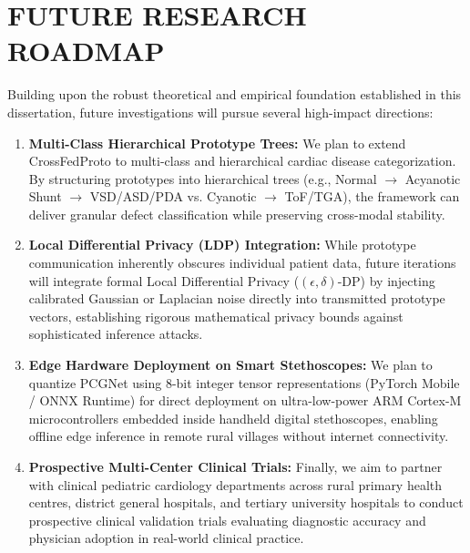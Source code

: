 \documentclass[12pt,a4paper]{amritareport}
\begin{document}
\section{FUTURE RESEARCH ROADMAP}

Building upon the robust theoretical and empirical foundation established in this dissertation, future investigations will pursue several high-impact directions:
\begin{enumerate}
	\item \textbf{Multi-Class Hierarchical Prototype Trees:} We plan to extend CrossFedProto to multi-class and hierarchical cardiac disease categorization. By structuring prototypes into hierarchical trees (e.g., Normal $\to$ Acyanotic Shunt $\to$ VSD/ASD/PDA vs. Cyanotic $\to$ ToF/TGA), the framework can deliver granular defect classification while preserving cross-modal stability.
	\item \textbf{Local Differential Privacy (LDP) Integration:} While prototype communication inherently obscures individual patient data, future iterations will integrate formal Local Differential Privacy ($(\epsilon, \delta)$-DP) by injecting calibrated Gaussian or Laplacian noise directly into transmitted prototype vectors, establishing rigorous mathematical privacy bounds against sophisticated inference attacks.
	\item \textbf{Edge Hardware Deployment on Smart Stethoscopes:} We plan to quantize PCGNet using 8-bit integer tensor representations (PyTorch Mobile / ONNX Runtime) for direct deployment on ultra-low-power ARM Cortex-M microcontrollers embedded inside handheld digital stethoscopes, enabling offline edge inference in remote rural villages without internet connectivity.
	\item \textbf{Prospective Multi-Center Clinical Trials:} Finally, we aim to partner with clinical pediatric cardiology departments across rural primary health centres, district general hospitals, and tertiary university hospitals to conduct prospective clinical validation trials evaluating diagnostic accuracy and physician adoption in real-world clinical practice.
\end{enumerate}


\end{document}
